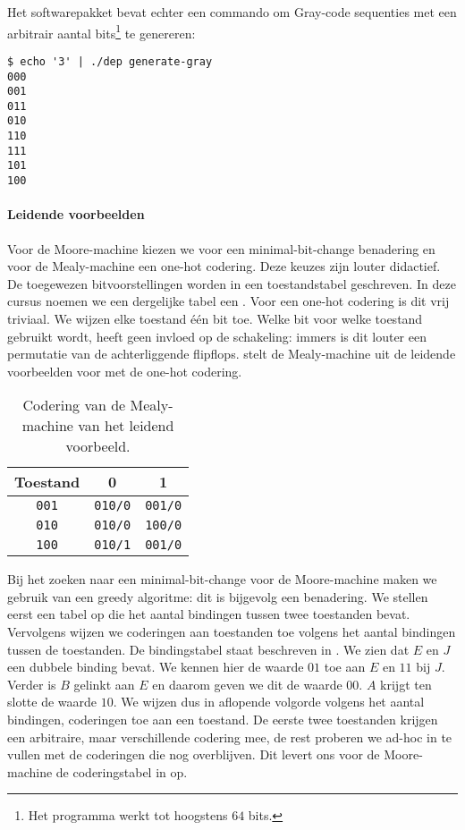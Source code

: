 Het softwarepakket bevat echter een commando om Gray-code sequenties met een arbitrair aantal bits\footnote{Het programma werkt tot hoogstens $64$ bits.} te genereren:

\begin{verbatim}
$ echo '3' | ./dep generate-gray
000
001
011
010
110
111
101
100
\end{verbatim}

\paragraph{Leidende voorbeelden}
Voor de Moore-machine kiezen we voor een minimal-bit-change benadering en voor de Mealy-machine een one-hot codering. Deze keuzes zijn louter didactief. De toegewezen bitvoorstellingen worden in een toestandstabel geschreven. In deze cursus noemen we een dergelijke tabel een . Voor een one-hot codering is dit vrij triviaal. We wijzen elke toestand \'e\'en bit toe. Welke bit voor welke toestand gebruikt wordt, heeft geen invloed op de schakeling: immers is dit louter een permutatie van de achterliggende flipflops.  stelt de Mealy-machine uit de leidende voorbeelden voor met de one-hot codering.

\begin{table}[hbt]
\centering
\begin{tabular}{c|cc}
Toestand&0&1\\\hline
\texttt{001}&\texttt{010/0}&\texttt{001/0}\\
\texttt{010}&\texttt{010/0}&\texttt{100/0}\\
\texttt{100}&\texttt{010/1}&\texttt{001/0}\\
\end{tabular}
\caption{Codering van de Mealy-machine van het leidend voorbeeld.}
\end{table}

Bij het zoeken naar een minimal-bit-change voor de Moore-machine maken we gebruik van een greedy algoritme: dit is bijgevolg een benadering. We stellen eerst een tabel op die het aantal bindingen tussen twee toestanden bevat. Vervolgens wijzen we coderingen aan toestanden toe volgens het aantal bindingen tussen de toestanden. De bindingstabel staat beschreven in . We zien dat $E$ en $J$ een dubbele binding bevat. We kennen hier de waarde $01$ toe aan $E$ en $11$ bij $J$. Verder is $B$ gelinkt aan $E$ en daarom geven we dit de waarde $00$. $A$ krijgt ten slotte de waarde $10$. We wijzen dus in aflopende volgorde volgens het aantal bindingen, coderingen toe aan een toestand. De eerste twee toestanden krijgen een arbitraire, maar verschillende codering mee, de rest proberen we ad-hoc in te vullen met de coderingen die nog overblijven. Dit levert ons voor de Moore-machine de coderingstabel in  op.

